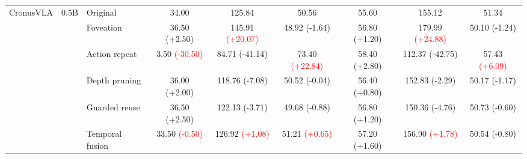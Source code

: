 \begin{table}[t]
\begin{tabular}{cclcccccc}
\multirow[c]{6}{*}{CronusVLA}
& \multirow[c]{6}{*}{0.5B}
& Original & 34.00 & 125.84 & 50.56 & 55.60 & 155.12 & 51.34 \\
& & Foveation & 36.50 {\scriptsize\textcolor{green!50!black}{(+2.50)}} & 145.91 {\scriptsize\textcolor{red}{(+20.07)}} & 48.92 {\scriptsize\textcolor{green!50!black}{(-1.64)}} & 56.80 {\scriptsize\textcolor{green!50!black}{(+1.20)}} & 179.99 {\scriptsize\textcolor{red}{(+24.88)}} & 50.10 {\scriptsize\textcolor{green!50!black}{(-1.24)}} \\
& & Action repeat & 3.50 {\scriptsize\textcolor{red}{(-30.50)}} & 84.71 {\scriptsize\textcolor{green!50!black}{(-41.14)}} & 73.40 {\scriptsize\textcolor{red}{(+22.84)}} & 58.40 {\scriptsize\textcolor{green!50!black}{(+2.80)}} & 112.37 {\scriptsize\textcolor{green!50!black}{(-42.75)}} & 57.43 {\scriptsize\textcolor{red}{(+6.09)}} \\
& & Depth pruning & 36.00 {\scriptsize\textcolor{green!50!black}{(+2.00)}} & 118.76 {\scriptsize\textcolor{green!50!black}{(-7.08)}} & 50.52 {\scriptsize\textcolor{green!50!black}{(-0.04)}} & 56.40 {\scriptsize\textcolor{green!50!black}{(+0.80)}} & 152.83 {\scriptsize\textcolor{green!50!black}{(-2.29)}} & 50.17 {\scriptsize\textcolor{green!50!black}{(-1.17)}} \\
& & Guarded reuse & 36.50 {\scriptsize\textcolor{green!50!black}{(+2.50)}} & 122.13 {\scriptsize\textcolor{green!50!black}{(-3.71)}} & 49.68 {\scriptsize\textcolor{green!50!black}{(-0.88)}} & 56.80 {\scriptsize\textcolor{green!50!black}{(+1.20)}} & 150.36 {\scriptsize\textcolor{green!50!black}{(-4.76)}} & 50.73 {\scriptsize\textcolor{green!50!black}{(-0.60)}} \\
& & Temporal fusion & 33.50 {\scriptsize\textcolor{red}{(-0.50)}} & 126.92 {\scriptsize\textcolor{red}{(+1.08)}} & 51.21 {\scriptsize\textcolor{red}{(+0.65)}} & 57.20 {\scriptsize\textcolor{green!50!black}{(+1.60)}} & 156.90 {\scriptsize\textcolor{red}{(+1.78)}} & 50.54 {\scriptsize\textcolor{green!50!black}{(-0.80)}} \\
\cmidrule(lr){1-9}


\end{tabular}
\end{table}
